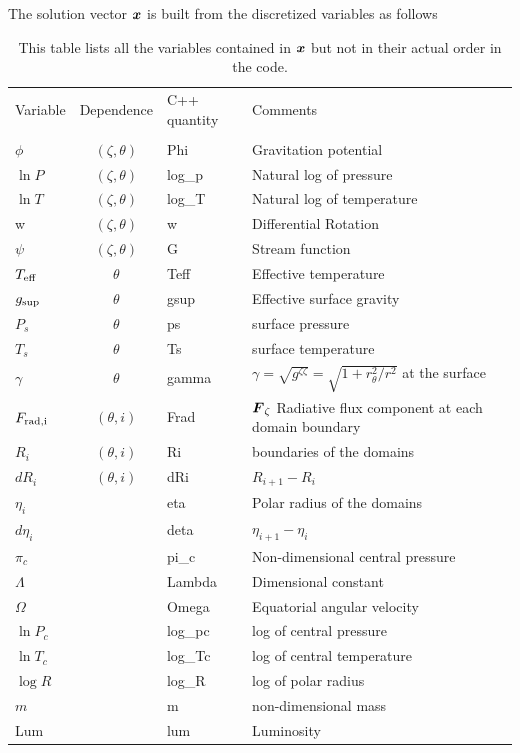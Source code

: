 The solution vector $\vx$ is built from the discretized variables as
follows

\begin{table}
\begin{center}
\begin{tabular}{lcll}
\hline
Variable & Dependence & C++ quantity & Comments \\
\\
$\phi$   & $(\zeta,\theta)$ &  Phi & Gravitation potential \\
$\ln P$  & $(\zeta,\theta)$ &  log\_p & Natural log of pressure     \\
$\ln T$  & $(\zeta,\theta)$ &  log\_T & Natural log of temperature  \\
   w     &  $(\zeta,\theta)$ &   w  & Differential Rotation    \\
$\psi$   &  $(\zeta,\theta)$ &   G  & Stream function    \\
$T_{\rm eff}$ & $\theta$ &  Teff  &  Effective temperature  \\
$g_{\rm sup}$ & $\theta$ &  gsup  &  Effective surface gravity  \\
$P_s$    &  $\theta$  &ps    &  surface pressure \\
$T_s$    &  $\theta$  &Ts    &  surface temperature \\
$\gamma$ &  $\theta$    & gamma    &
$\gamma=\sqrt{g^{\zeta\zeta}}=\sqrt{1+r_\theta^2/r^2}$ at the surface \\
$F_{\rm rad,i}$ &  $(\theta, i)$ &  Frad & $\vF_\zeta$ Radiative flux
component at each domain boundary\\
$R_i$    &  $(\theta,i)$       &   Ri & boundaries of the domains \\
$dR_i$   &  $(\theta,i)$       &   dRi& $R_{i+1}-R_i$      \\
$\eta_i$ &                   &   eta& Polar radius of the domains \\
$d\eta_i$&                   &  deta& $\eta_{i+1}-\eta_i$      \\
$\pi_c$  &                  &  pi\_c &  Non-dimensional central pressure \\
$\Lambda$&                  &  Lambda &   Dimensional constant  \\
$\Omega$ &                  &  Omega  &   Equatorial angular velocity \\
$\ln P_c$&                  & log\_pc &   log of central pressure  \\
$\ln T_c$&                  & log\_Tc &   log of central temperature  \\
$\log R$ &                  &log\_R  &   log of polar radius \\
$m$      &                  &       m     & non-dimensional mass\\
Lum      &                  &  lum   &  Luminosity  \\
      \hline
\end{tabular}
\end{center}
\caption[]
{This table lists all the variables contained in $\vx$ but not
in their actual order in the code.}
\end{table}

